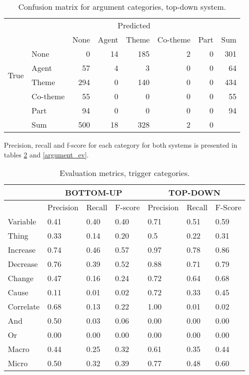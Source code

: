 \begin{table}
\begin{center}
\begin{tabular}{ | l | l | r | r | r | r | r | r | }
	\hline
	\multirow{8}{*}{True} & \multicolumn{7}{c|}{Predicted} \\ \cline{1-8}
	&\cellcolor{gray} & None & Agent & Theme & Co-theme & Part & Sum \\ \cline{2-8}
	&None & \cellcolor{g} 0 & 14 & 185 & 2 & 0 &  301 \\
	&Agent & 57 & \cellcolor{g} 4 & 3 & 0 & 0 & 64 \\
	&Theme & 294 & 0 & \cellcolor{g} 140 & 0 & 0 & 434 \\
	&Co-theme & 55 & 0 & 0 & \cellcolor{g} 0 & 0 & 55 \\
	&Part & 94 & 0 & 0 & 0 & \cellcolor{g} 0 & 94 \\ \hline	
	& Sum & 500 & 18 & 328 & 2 & 0 & \\ \hline
\end{tabular}
\end{center}
\caption{Confusion matrix for argument categories, top-down system.}
\label{pms_argument_conf}
\end{table}

Precision, recall and f-score for each category for both systems is presented in tables \ref{trigger_ev} and \ref{argument_ev}. 

\begin{table}
\begin{center}
\begin{tabular}{ | l | l | l | l | l | l | l | }
	\hline
	\cellcolor{gray} & \multicolumn{3}{c}{BOTTOM-UP} & \multicolumn{3}{c|}{TOP-DOWN} \\ \hline
	\cellcolor{gray} & Precision & Recall & F-score & Precision & Recall & F-Score \\ \hline
	Variable & 0.41 & 0.40 & 0.40 & 0.71 & 0.51 & 0.59 \\
	Thing & 0.33 & 0.14 & 0.20 & 0.5 & 0.22 & 0.31 \\
	Increase & 0.74 & 0.46 & 0.57 & 0.97 & 0.78 & 0.86 \\
	Decrease & 0.76 & 0.39 & 0.52 & 0.88 & 0.71 & 0.79 \\ 
	Change & 0.47 & 0.16 & 0.24 & 0.72 & 0.64 & 0.68 \\ 
	Cause & 0.11 & 0.01 & 0.02 & 0.72 & 0.33 & 0.45 \\ 
	Correlate & 0.68 & 0.13 & 0.22 & 1.00 & 0.01 & 0.02 \\ 
	And & 0.50 & 0.03 & 0.06 & 0.00 & 0.00 & 0.00 \\
	Or & 0.00 & 0.00 & 0.00 & 0.00 & 0.00 & 0.00 \\ \hline
	Macro & 0.44 & 0.25 & 0.32 & 0.61 & 0.35 & 0.44 \\
	Micro & 0.50 & 0.32 & 0.39 & 0.77 & 0.48 & 0.60 \\ \hline
\end{tabular}
\end{center}
\caption{Evaluation metrics, trigger categories.}
\label{trigger_ev}
\end{table}

